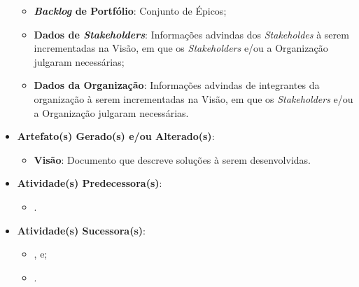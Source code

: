 \begin{itemize}
{\begin{itemize}
							\item{\textbf{\emph{Backlog} de Portfólio}: Conjunto de Épicos;}
							\item{\textbf{Dados de \emph{Stakeholders}}: Informações advindas dos \emph{Stakeholdes} à serem incrementadas na Visão, em que os \emph{Stakeholders} e/ou a Organização julgaram necessárias;}
							\item{\textbf{Dados da Organização}: Informações advindas de integrantes da organização à serem incrementadas na Visão, em que os \emph{Stakeholders} e/ou a Organização julgaram necessárias.}
						\end{itemize}}
					\item{\textbf{Artefato(s) Gerado(s) e/ou Alterado(s)}:
						\begin{itemize}
							\item{\textbf{Visão}: Documento que descreve soluções à serem desenvolvidas.}
						\end{itemize}}
					\item{\textbf{Atividade(s) Predecessora(s)}:
						\begin{itemize}
							\item{.}
						\end{itemize}}
					\item{\textbf{Atividade(s) Sucessora(s)}:
						\begin{itemize}
							\item{, e;}
							\item{.}
						\end{itemize}}
				\end{itemize}

